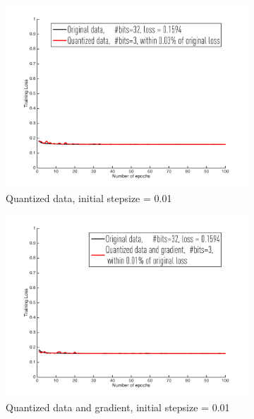 \documentclass{article}
\begin{document}
\begin{figure}[h]
\centering
    \begin{subfigure}[h]{.3\columnwidth}
    \includegraphics[width=\columnwidth]{lssvm/cod-rna/d001}
    \caption{Quantized data, initial stepsize = 0.01}
    \end{subfigure}
    \begin{subfigure}[h]{.3\columnwidth}
    \includegraphics[width=\columnwidth]{lssvm/cod-rna/dg001}
    \caption{Quantized data and gradient, initial stepsize = 0.01}
    \end{subfigure}
    \begin{subfigure}[h]{.3\columnwidth}

\end{subfigure}
\end{figure}
\end{document}

